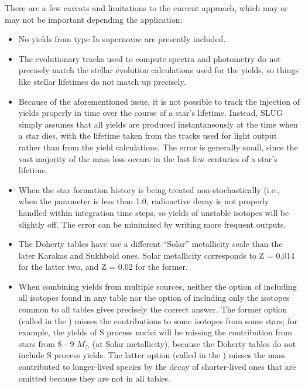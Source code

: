 \documentclass[letterpaper,10pt,english]{sphinxmanual}
\begin{document}
There are a few caveats and limitations to the current approach, which
may or may not be important depending the application:
\begin{itemize}
\item {} 
No yields from type Ia supernovae are presently included.

\item {} 
The evolutionary tracks used to compute spectra and photometry do
not precisely match the stellar evolution calculations used for
the yields, so things like stellar lifetimes do not match up
precisely.

\item {} 
Because of the aforementioned issue, it is not possible to track
the injection of yields properly in time over the course of a
star’s lifetime. Instead, SLUG simply assumes that all yields are
produced instantaneously at the time when a star dies, with the
lifetime taken from the tracks used for light output rather than
from the yield calculations. The error is generally small, since
the vast majority of the mass loss occurs in the last few
centuries of a star’s lifetime.

\item {} 
When the star formation history is being treated
non-stochastically (i.e., when the parameter  is
less than 1.0, radioactive decay is not properly handled within
integration time steps, so yields of unstable isotopes will be
slightly off. The error can be minimized by writing more frequent
outputs.

\item {} 
The Doherty tables have use a different “Solar” metallicity
scale than the later Karakas and Sukhbold ones. Solar metallicity
corresponds to Z = 0.014 for the latter two, and Z = 0.02 for the
former.

\item {} 
When combining yields from multiple sources, neither the option of
including all isotopes found in any table nor the option of
including only the isotopes common to all tables gives precisely
the correct answer. The former option (called  in the
{\hyperref[\detokenize{parameters:ssec-yield-keywords}]{}}) misses the contributions to some
isotopes from some stars; for example, the yields of S process
nuclei will be missing the contribution from stars from 8 - 9
\(M_\odot\) (at Solar metallicity), because the Doherty tables
do not include S process yields. The latter option (called
 in the {\hyperref[\detokenize{parameters:ssec-yield-keywords}]{}}) misses the
mass contributed to longer-lived species by the decay of
shorter-lived ones that are omitted because they are not in all
tables.

\end{itemize}
\end{document}
